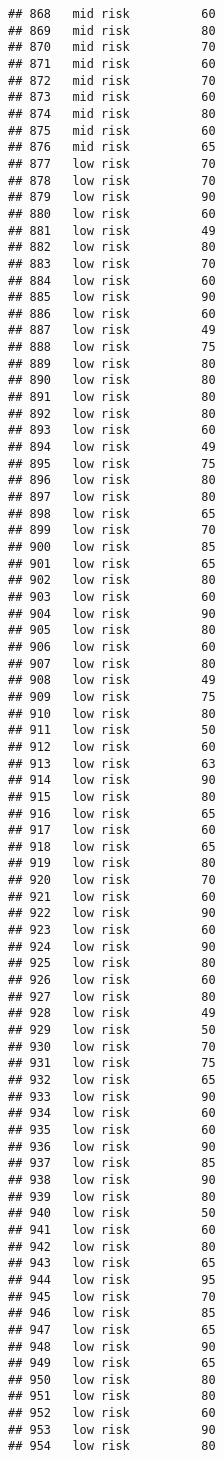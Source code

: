 \documentclass[
  ignorenonframetext,
]{beamer}
\begin{document}
\begin{frame}[fragile]
\begin{verbatim}
## 868   mid risk          60
## 869   mid risk          80
## 870   mid risk          70
## 871   mid risk          60
## 872   mid risk          70
## 873   mid risk          60
## 874   mid risk          80
## 875   mid risk          60
## 876   mid risk          65
## 877   low risk          70
## 878   low risk          70
## 879   low risk          90
## 880   low risk          60
## 881   low risk          49
## 882   low risk          80
## 883   low risk          70
## 884   low risk          60
## 885   low risk          90
## 886   low risk          60
## 887   low risk          49
## 888   low risk          75
## 889   low risk          80
## 890   low risk          80
## 891   low risk          80
## 892   low risk          80
## 893   low risk          60
## 894   low risk          49
## 895   low risk          75
## 896   low risk          80
## 897   low risk          80
## 898   low risk          65
## 899   low risk          70
## 900   low risk          85
## 901   low risk          65
## 902   low risk          80
## 903   low risk          60
## 904   low risk          90
## 905   low risk          80
## 906   low risk          60
## 907   low risk          80
## 908   low risk          49
## 909   low risk          75
## 910   low risk          80
## 911   low risk          50
## 912   low risk          60
## 913   low risk          63
## 914   low risk          90
## 915   low risk          80
## 916   low risk          65
## 917   low risk          60
## 918   low risk          65
## 919   low risk          80
## 920   low risk          70
## 921   low risk          60
## 922   low risk          90
## 923   low risk          60
## 924   low risk          90
## 925   low risk          80
## 926   low risk          60
## 927   low risk          80
## 928   low risk          49
## 929   low risk          50
## 930   low risk          70
## 931   low risk          75
## 932   low risk          65
## 933   low risk          90
## 934   low risk          60
## 935   low risk          60
## 936   low risk          90
## 937   low risk          85
## 938   low risk          90
## 939   low risk          80
## 940   low risk          50
## 941   low risk          60
## 942   low risk          80
## 943   low risk          65
## 944   low risk          95
## 945   low risk          70
## 946   low risk          85
## 947   low risk          65
## 948   low risk          90
## 949   low risk          65
## 950   low risk          80
## 951   low risk          80
## 952   low risk          60
## 953   low risk          90
## 954   low risk          80

\end{verbatim}
\end{frame}
\end{document}
